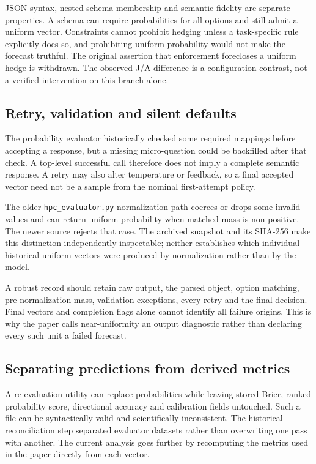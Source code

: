 JSON syntax, nested schema membership and semantic fidelity are separate properties. A schema can require probabilities for all options and still admit a uniform vector. Constraints cannot prohibit hedging unless a task-specific rule explicitly does so, and prohibiting uniform probability would not make the forecast truthful. The original assertion that enforcement forecloses a uniform hedge is withdrawn. The observed J/A difference is a configuration contrast, not a verified intervention on this branch alone.

\subsection{Retry, validation and silent defaults}
The probability evaluator historically checked some required mappings before accepting a response, but a missing micro-question could be backfilled after that check. A top-level successful call therefore does not imply a complete semantic response. A retry may also alter temperature or feedback, so a final accepted vector need not be a sample from the nominal first-attempt policy.

The older \texttt{hpc\_evaluator.py} normalization path coerces or drops some invalid values and can return uniform probability when matched mass is non-positive. The newer source rejects that case. The archived snapshot and its SHA-256 make this distinction independently inspectable; neither establishes which individual historical uniform vectors were produced by normalization rather than by the model.

A robust record should retain raw output, the parsed object, option matching, pre-normalization mass, validation exceptions, every retry and the final decision. Final vectors and completion flags alone cannot identify all failure origins. This is why the paper calls near-uniformity an output diagnostic rather than declaring every such unit a failed forecast.

\subsection{Separating predictions from derived metrics}
A re-evaluation utility can replace probabilities while leaving stored Brier, ranked probability score, directional accuracy and calibration fields untouched. Such a file can be syntactically valid and scientifically inconsistent. The historical reconciliation step separated evaluator datasets rather than overwriting one pass with another. The current analysis goes further by recomputing the metrics used in the paper directly from each vector.

